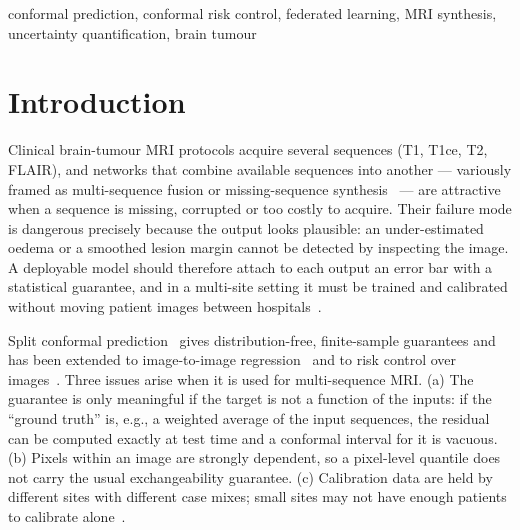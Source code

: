 \documentclass[conference]{IEEEtran}
\begin{document}
\begin{IEEEkeywords}
conformal prediction, conformal risk control, federated learning, MRI synthesis, uncertainty quantification, brain tumour
\end{IEEEkeywords}

\section{Introduction}
\label{sec:intro}

Clinical brain-tumour MRI protocols acquire several sequences (T1, T1ce, T2, FLAIR), and networks that combine available sequences into another --- variously framed as multi-sequence fusion or missing-sequence synthesis~\cite{dar2019pgan,zhang2021ifcnn,tang2022matr} --- are attractive when a sequence is missing, corrupted or too costly to acquire. Their failure mode is dangerous precisely because the output looks plausible: an under-estimated oedema or a smoothed lesion margin cannot be detected by inspecting the image. A deployable model should therefore attach to each output an error bar with a statistical guarantee, and in a multi-site setting it must be trained and calibrated without moving patient images between hospitals~\cite{mcmahan2017fedavg}.

Split conformal prediction~\cite{vovk2005alrw,lei2018distribution} gives distribution-free, finite-sample guarantees and has been extended to image-to-image regression~\cite{angelopoulos2022im2im} and to risk control over images~\cite{angelopoulos2022crc,teneggi2023krcps}. Three issues arise when it is used for multi-sequence MRI. (a) The guarantee is only meaningful if the target is not a function of the inputs: if the ``ground truth'' is, e.g., a weighted average of the input sequences, the residual can be computed exactly at test time and a conformal interval for it is vacuous. (b) Pixels within an image are strongly dependent, so a pixel-level quantile does not carry the usual exchangeability guarantee. (c) Calibration data are held by different sites with different case mixes; small sites may not have enough patients to calibrate alone~\cite{lu2023fedcp}.
\end{document}
